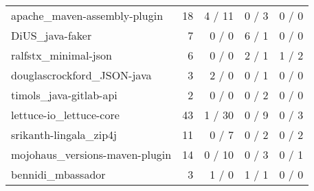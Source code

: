 \begin{table}[]
\begin{tabular}{lrrrr}
        apache\_maven-assembly-plugin        & 18                 & 4 / 11              & 0 / 3                & 0 / 0                 \\
        DiUS\_java-faker                     & 7                  & 0 / 0               & 6 / 1                & 0 / 0                 \\
        ralfstx\_minimal-json                & 6                  & 0 / 0               & 2 / 1                & 1 / 2                 \\
        douglascrockford\_JSON-java          & 3                  & 2 / 0               & 0 / 1                & 0 / 0                 \\
        timols\_java-gitlab-api              & 2                  & 0 / 0               & 0 / 2                & 0 / 0                 \\
        lettuce-io\_lettuce-core             & 43                 & 1 / 30              & 0 / 9                & 0 / 3                 \\
        srikanth-lingala\_zip4j              & 11                 & 0 / 7               & 0 / 2                & 0 / 2                 \\
        mojohaus\_versions-maven-plugin      & 14                 & 0 / 10              & 0 / 3                & 0 / 1                 \\
        bennidi\_mbassador                   & 3                  & 1 / 0               & 1 / 1                & 0 / 0
    \end{tabular}
\end{table}


